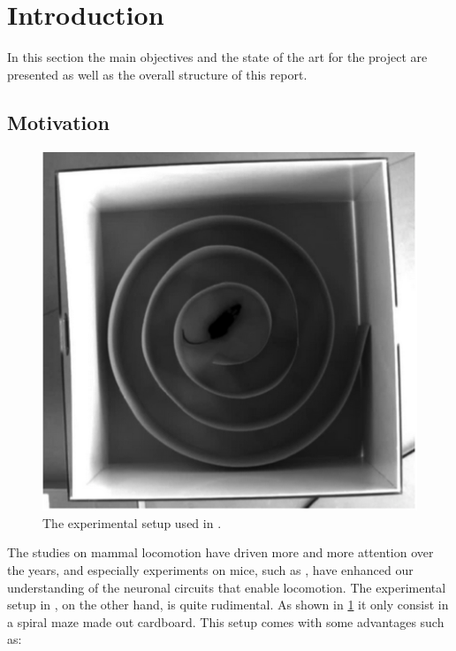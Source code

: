 \documentclass[12pt,a4paper]{article}
\begin{document}
\clearpage
\lfoot{ }
\rfoot{ }
\chead{ }


\pagestyle{plain}
\clearpage

\tableofcontents
\clearpage
\pagestyle{fancy}
\section{Introduction}\label{sec:intro}
In this section the main objectives and the state of the art for the project are presented as well as the overall structure of this report.
\subsection{Motivation}
\begin{figure}
	\includegraphics[width=\linewidth]{fig/OleSetup.png}
	\caption{The experimental setup used in \cite{Ole}.}\label{fig:OleSetup}
	\vspace{-2 cm}
\end{figure}
The studies on mammal locomotion have driven more and more attention over the years, and especially experiments on mice, such as \cite{Ole}, have enhanced our understanding of the neuronal circuits that enable locomotion. The experimental setup in \cite{Ole}, on the other hand, is quite rudimental. As shown in \ref{fig:OleSetup} it only consist in a spiral maze made out cardboard. This setup comes with some advantages such as:
\end{document}
